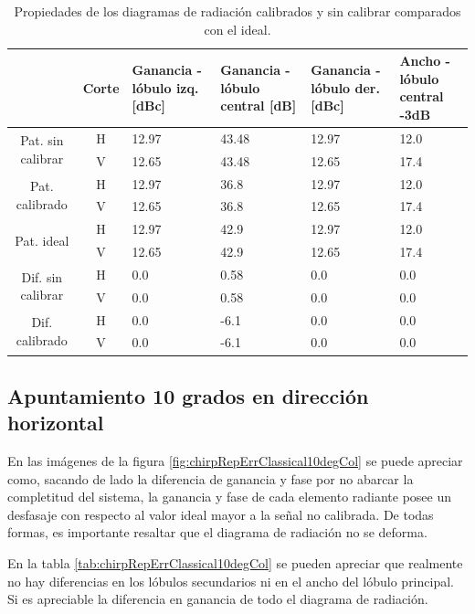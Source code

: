 \begin{table}[H]
  \footnotesize
  \centering
  \begin{tabular}{|c|c|p{2cm}|p{2.5cm}|p{2.5cm}|p{2.5cm}|}
    \cline{2-6}
    \multicolumn{1}{c|}{} & Corte & Ganancia - lóbulo izq. [dBc] & Ganancia - lóbulo central [dB] &
    Ganancia - lóbulo der. [dBc] & Ancho - lóbulo central -3dB \tabularnewline\hline
    \multirow{2}{2cm}{Pat. sin calibrar} & H & 12.97 & 43.48 & 12.97 & 12.0 \tabularnewline\cline{2-6}
     & V & 12.65 & 43.48 & 12.65 & 17.4 \tabularnewline\hline
    \multirow{2}{2cm}{Pat. calibrado} & H & 12.97 & 36.8 & 12.97 & 12.0 \tabularnewline\cline{2-6}
     & V & 12.65 & 36.8 & 12.65 & 17.4 \tabularnewline\hline
    \multirow{2}{2cm}{Pat. ideal} & H & 12.97 & 42.9 & 12.97 & 12.0 \tabularnewline\cline{2-6}
     & V & 12.65 & 42.9 & 12.65 & 17.4 \tabularnewline\hline
    \multirow{2}{2cm}{Dif. sin calibrar} & H & 0.0 & 0.58 & 0.0 & 0.0\tabularnewline\cline{2-6}
     & V & 0.0 & 0.58 & 0.0 & 0.0 \tabularnewline\hline
    \multirow{2}{2cm}{Dif. calibrado} & H & 0.0 & -6.1 & 0.0 & 0.0 \tabularnewline\cline{2-6}
     & V & 0.0 & -6.1 & 0.0 & 0.0 \tabularnewline\hline
  \end{tabular}
  \caption{Propiedades de los diagramas de radiación calibrados y sin calibrar comparados con el ideal.}
  \label{tab:chirpRepErrClassical0deg}
\end{table}


\subsection{Apuntamiento 10 grados en dirección horizontal}

En las imágenes de la figura \ref{fig:chirpRepErrClassical10degCol} se puede apreciar como, sacando de lado la diferencia de 
ganancia y fase por no abarcar la completitud del sistema, la ganancia y fase de cada elemento radiante posee un desfasaje con 
respecto al valor ideal mayor a la señal no calibrada. De todas formas, es importante resaltar que el diagrama de radiación no 
se deforma. 

En la tabla \ref{tab:chirpRepErrClassical10degCol} se pueden apreciar que realmente no hay diferencias en los lóbulos secundarios 
ni en el ancho del lóbulo principal. Si es apreciable la diferencia en ganancia de todo el diagrama de radiación.

